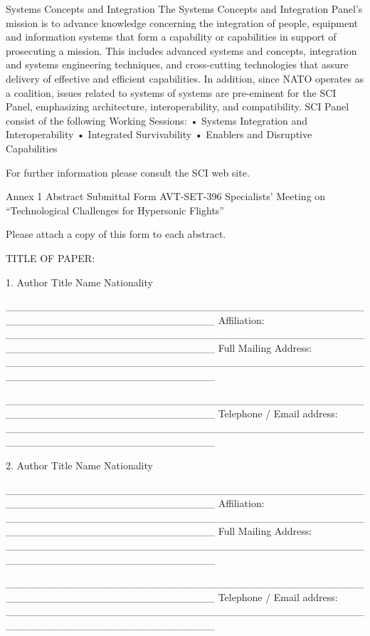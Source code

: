 Systems Concepts and Integration
The Systems Concepts and Integration Panel’s mission is to advance knowledge concerning the integration of people, equipment and information systems that form a capability or capabilities in support of prosecuting a mission. This includes advanced systems and concepts, integration and systems engineering techniques, and cross-cutting technologies that assure delivery of effective and efficient capabilities. In addition, since NATO operates as a coalition, issues related to systems of systems are pre-eminent for the SCI Panel, emphasizing architecture, interoperability, and compatibility.
SCI Panel consist of the following Working Sessions:
•	Systems Integration and Interoperability
•	Integrated Survivability
•	Enablers and Disruptive Capabilities

For further information please consult the SCI web site.

 
Annex 1
Abstract Submittal Form
AVT-SET-396 Specialists’ Meeting on “Technological Challenges for Hypersonic Flights” 

Please attach a copy of this form to each abstract.



TITLE OF PAPER: 





1. Author Title			Name						Nationality

____________________________________________________________________________
Affiliation: ____________________________________________________________________________
Full Mailing Address: ____________________________________________________________________________

____________________________________________________________________________
Telephone / Email address: ____________________________________________________________________________



2. Author Title			Name						Nationality

____________________________________________________________________________
Affiliation: ____________________________________________________________________________
Full Mailing Address: ____________________________________________________________________________

____________________________________________________________________________
Telephone / Email address: ____________________________________________________________________________



